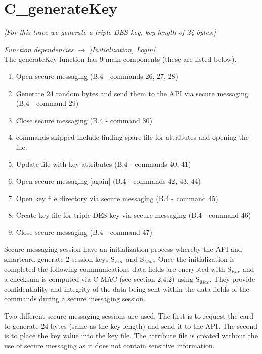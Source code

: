\documentclass[bsc,frontabs,twoside,singlespacing,parskip,deptreport]{infthesis}     %
\begin{document}
\section{C\_generateKey}
\textit{[For this trace we generate a triple DES key, key length of 24 bytes.]}

\textit{Function dependencies $\rightarrow$ [Initialization, Login]}\\

The generateKey function has 9 main components (these are listed below).

\begin{enumerate}
\item Open secure messaging (B.4 - commands 26, 27, 28)
\item Generate 24 random bytes and send them to the API via secure messaging (B.4 - command 29)
\item Close secure messaging (B.4 - command 30)
\item commands skipped include finding spare file for attributes and opening the file.
\item Update file with key attributes (B.4 - commands 40, 41)
\item Open secure messaging [again] (B.4 - commands 42, 43, 44)
\item Open key file directory via secure messaging (B.4 - command 45)
\item Create key file for triple DES key via secure messaging (B.4 - command 46)
\item Close secure messaging (B.4 - command 47)\\
\end{enumerate}

Secure messaging session have an initialization process whereby the API and smartcard generate 2 session keys S$_{Enc}$ and S$_{Mac}$. Once the initialization is completed the following communications data fields are encrypted with S$_{Enc}$ and a checksum is computed via C-MAC (see section 2.4.2) using S$_{Mac}$. They provide confidentiality and integrity of the data being sent within the data fields of the commands during a secure messaging session.

Two different secure messaging sessions are used. The first is to request the card to generate 24 bytes (same as the key length) and send it to the API. The second is to place the key value into the key file. The attribute file is created without the use of secure messaging as it does not contain sensitive information.
\end{document}
